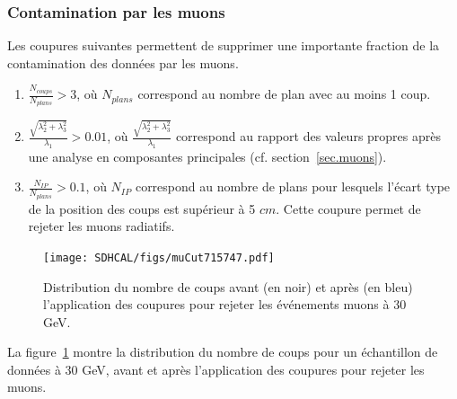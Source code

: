 \subsubsection{Contamination par les muons}
Les coupures suivantes permettent de supprimer une importante fraction de la contamination des données par les muons.
\begin{enumerate}[-]
\item $\frac{N_{coups}}{N_{plans}}>3$, où $N_{plans}$ correspond au nombre de plan avec au moins 1 coup.
\item $\frac{\sqrt{\lambda_2^2+\lambda_3^2}}{\lambda_1}>0.01$, où $\frac{\sqrt{\lambda_2^2+\lambda_3^2}}{\lambda_1}$ correspond au rapport des valeurs propres après une analyse en composantes principales (cf. section~\ref{sec.muons}).
\item $\frac{N_{IP}}{N_{plans}}>0.1$, où $N_{IP}$ correspond au nombre de plans pour lesquels l'écart type de la position des coups est supérieur à 5 $cm$. Cette coupure permet de rejeter les muons radiatifs. 
\end{enumerate}
\begin{figure}[!h]
  \begin{center}
    \texttt{[image: SDHCAL/figs/muCut715747.pdf]}
    \caption{Distribution du nombre de coups avant (en noir) et après (en bleu) l'application des coupures pour rejeter les événements muons à 30 GeV.}
    \label{fig:muCut}
  \end{center}
\end{figure}
La figure~\ref{fig:muCut} montre la distribution du nombre de coups pour un échantillon de données à 30 GeV, avant et après l'application des coupures pour rejeter les muons.
